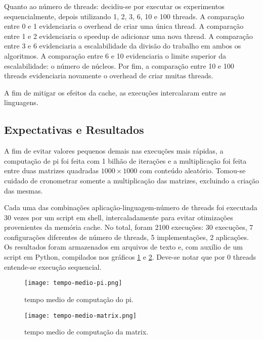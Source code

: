 \documentclass[12pt,a4paper]{article}
\begin{document}
Quanto ao número de threads: decidiu-se por executar os experimentos sequencialmente, depois utilizando 1, 2, 3, 6, 10  e 100 threads. A comparação entre 0 e 1 evidenciaria o overhead de criar uma única thread. A comparação entre 1 e 2 evidenciaria o speedup de adicionar uma nova thread. A comparação entre 3 e 6 evidenciaria a escalabilidade da divisão do trabalho em ambos os algoritmos. A comparação entre 6 e 10 evidenciaria o limite superior da escalabilidade: o número de núcleos. Por fim, a comparação entre 10 e 100 threads evidenciaria novamente o overhead de criar muitas threads.

A fim de mitigar os efeitos da cache, as execuções intercalaram entre as linguagens.

\subsection{Expectativas e Resultados}

A fim de evitar valores pequenos demais nas execuções mais rápidas, a computação de pi foi feita com 1 bilhão de iterações e a multiplicação foi feita entre duas matrizes quadradas $1000 \times 1000$ com conteúdo aleatório. Tomou-se cuidado de cronometrar somente a multiplicação das matrizes, excluindo a criação das mesmas.

Cada uma das combinações aplicação-linguagem-número de threads foi executada 30 vezes por um script em shell, intercaladamente para evitar otimizações provenientes da memória cache. No total, foram 2100 execuções: 30 execuções, 7 configurações diferentes de número de threads, 5 implementações, 2 aplicações. Os resultados foram armazenados em arquivos de texto e, com auxílio de um script em Python,  compilados nos gráficos \ref{fig:tempo medio pi} e \ref{fig:tempo medio matrix}. Deve-se notar que por 0 threads entende-se execução sequencial.

\begin{figure}[t] %
    \centering
    \texttt{[image: tempo-medio-pi.png]}
    \caption{tempo medio de computação do pi.}
    \label{fig:tempo medio pi}
\end{figure}

\begin{figure}[t] %
    \centering
    \texttt{[image: tempo-medio-matrix.png]}
    \caption{tempo medio de computação da matrix.}
    \label{fig:tempo medio matrix}
\end{figure}
\end{document}
